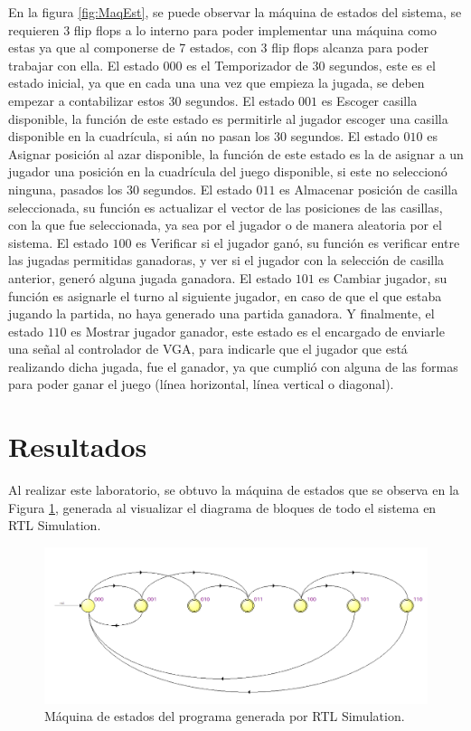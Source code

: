 \documentclass[journal,trans]{IEEEtran}
\begin{document}
	En la figura  \ref{fig:MaqEst}, se puede observar la máquina de estados del sistema, se requieren 3 flip flops a lo interno para poder implementar una máquina como estas ya que al componerse de 7 estados, con 3 flip flops alcanza para poder trabajar con ella. El estado $000$ es el Temporizador de 30 segundos, este es el estado inicial, ya que en cada una una vez que empieza la jugada, se deben empezar a contabilizar estos 30 segundos. El estado $001$ es Escoger casilla disponible, la función de este estado es permitirle al jugador escoger una casilla disponible en la cuadrícula, si aún no pasan los 30 segundos. El estado $010$ es Asignar posición al azar disponible, la función de este estado es la de asignar a un jugador una posición en la cuadrícula del juego disponible, si este no seleccionó ninguna, pasados los 30 segundos. El estado $011$ es Almacenar posición de casilla seleccionada, su función es actualizar el vector de las posiciones de las casillas, con la que fue seleccionada, ya sea por el jugador o de manera aleatoria por el sistema. El estado $100$ es Verificar si el jugador ganó, su función es verificar entre las jugadas permitidas ganadoras, y ver si el jugador con la selección de casilla anterior, generó alguna jugada ganadora. El estado $101$ es Cambiar jugador, su función es asignarle el turno al siguiente jugador, en caso de que el que estaba jugando la partida, no haya generado una partida ganadora. Y finalmente, el estado $110$  es Mostrar jugador ganador, este estado es el encargado de enviarle una señal al controlador de VGA, para indicarle que el jugador que está realizando dicha jugada, fue el ganador, ya que cumplió con alguna de las formas para poder ganar el juego (línea horizontal, línea vertical o diagonal).
	
	\section{Resultados}
	
	Al realizar este laboratorio, se obtuvo la máquina de estados que se observa en la Figura \ref{fig:MaqR1}, generada al visualizar el diagrama de bloques de todo el sistema en RTL Simulation.
	
	\begin{figure}[hbtp]
		\centering
		\includegraphics[width = \columnwidth]{imagenes/MaqR1.png}
		\caption[Figura1]{Máquina de estados del programa generada por RTL Simulation.}
		\label{fig:MaqR1}
	\end{figure}
	
\end{document}
